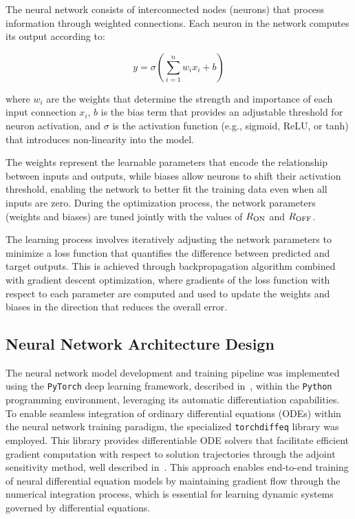 \documentclass[lettersize,journal]{IEEEtran}
\begin{document}
The neural network consists of interconnected nodes (neurons) that process information through weighted connections. Each neuron in the network computes its output according to:

\begin{equation}
  y = \sigma\left(\sum_{i=1}^{n} w_i x_i + b\right)
\end{equation}

where \(w_i\) are the weights that determine the strength and importance of each input connection \(x_i\), \(b\) is the bias term that provides an adjustable threshold for neuron activation, and \(\sigma\) is the activation function (e.g., sigmoid, ReLU, or tanh) that introduces non-linearity into the model.

The weights represent the learnable parameters that encode the relationship between inputs and outputs, while biases allow neurons to shift their activation threshold, enabling the network to better fit the training data even when all inputs are zero. During the optimization process, the network parameters (weights and biases) are tuned jointly with the values of \(R_{\rm ON}\) and \(R_{\rm OFF}\).

The learning process involves iteratively adjusting the network parameters to minimize a loss function that quantifies the difference between predicted and target outputs. This is  achieved through backpropagation algorithm combined with gradient descent optimization, where gradients of the loss function with respect to each parameter are computed and used to update the weights and biases in the direction that reduces the overall error.

\subsection{Neural Network Architecture Design}

\noindent The neural network model development and training pipeline was implemented using the \texttt{PyTorch} deep learning framework, described in~\cite{paszke2019pytorchimperativestylehighperformance}, within the \texttt{Python} programming environment, leveraging its automatic differentiation capabilities. To enable seamless integration of ordinary differential equations (ODEs) within the neural network training paradigm, the specialized \texttt{torchdiffeq} library was employed. This library provides differentiable ODE solvers that facilitate efficient gradient computation with respect to solution trajectories through the adjoint sensitivity method, well described in~\cite{Ricky2018, Ricky2021, torchdiffeq}. This approach enables end-to-end training of neural differential equation models by maintaining gradient flow through the numerical integration process, which is essential for learning dynamic systems governed by differential equations.
\end{document}
